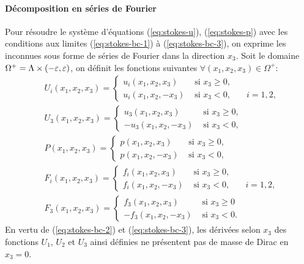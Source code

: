 \paragraph{Décomposition en séries de Fourier}
Pour résoudre le système d'équations (\ref{eq:stokes-u}),
(\ref{eq:stokes-p}) avec les conditions aux limites (\ref{eq:stokes-bc-1}) à
(\ref{eq:stokes-bc-3}), on exprime les inconnues sous forme de séries
de Fourier dans la direction $x_3$. Soit le domaine $\Omega^+ = \Lambda
\times (-\varepsilon, \varepsilon)$, on définit les fonctions suivantes
$\forall (x_1, x_2, x_3)\in \Omega^+$:
\begin{align}
  & U_i(x_1, x_2, x_3) = \left\{
    \begin{array}{lll}
      u_i(x_1, x_2, x_3) &\text{ si } x_3 \geq 0,\\
      u_i(x_1, x_2, -x_3) &\text{ si } x_3 < 0,     & \quad i = 1,2,
    \end{array}
  \right.\label{eq:decomp-1}\\
  & U_3(x_1, x_2, x_3) = \left\{
    \begin{array}{ll}
       u_3(x_1, x_2, x_3) &\text{ si } x_3 \geq 0,\\
      -u_3(x_1, x_2, -x_3) &\text{ si } x_3 < 0,
    \end{array}
  \right.\label{eq:decomp-2}\\
  & P(x_1, x_2, x_3) = \left\{
    \begin{array}{ll}
      p(x_1, x_2, x_3) &\text{ si } x_3 \geq 0,\\
      p(x_1, x_2, -x_3) &\text{ si } x_3 < 0,
    \end{array}
  \right.\label{eq:decomp-3}\\
  & F_i(x_1, x_2, x_3) = \left\{
    \begin{array}{lll}
      f_i(x_1, x_2, x_3) &\text{ si } x_3 \geq 0,\\
      f_i(x_1, x_2, -x_3) &\text{ si } x_3 < 0,     & \quad i = 1,2,
    \end{array}
  \right.\label{eq:decomp-4}\\
  & F_3(x_1, x_2, x_3) = \left\{
    \begin{array}{ll}
      f_3(x_1, x_2, x_3) &\text{ si } x_3 \geq 0\\
     -f_3(x_1, x_2, -x_3) &\text{ si } x_3 < 0.
    \end{array}
  \right.\label{eq:decomp-5}
\end{align}
En vertu de (\ref{eq:stokes-bc-2}) et (\ref{eq:stokes-bc-3}), les
dérivées selon $x_3$ des fonctions $U_1$, $U_2$ et $U_3$ ainsi définies ne
présentent pas de masse de Dirac en $x_3 = 0$.

